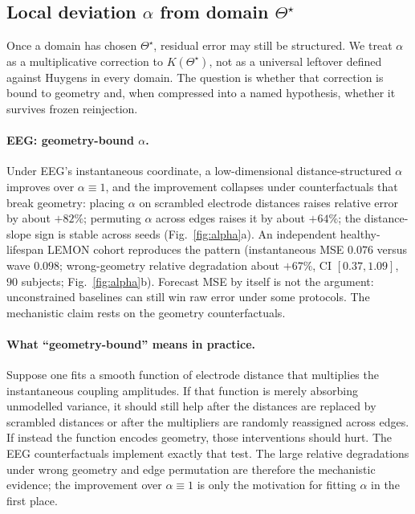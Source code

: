 \documentclass[twocolumn,10pt]{article}
\begin{document}
\subsection*{Local deviation \(\alpha\) from domain \(\Theta^{\star}\)}

Once a domain has chosen \(\Theta^{\star}\), residual error may still be
structured. We treat \(\alpha\) as a multiplicative correction to
\(K(\Theta^{\star})\), not as a universal leftover defined against Huygens in
every domain. The question is whether that correction is bound to geometry and,
when compressed into a named hypothesis, whether it survives frozen reinjection.

\paragraph{EEG: geometry-bound \(\alpha\).}
Under EEG's instantaneous coordinate, a low-dimensional distance-structured
\(\alpha\) improves over \(\alpha\equiv1\), and the improvement collapses under
counterfactuals that break geometry: placing \(\alpha\) on scrambled electrode
distances raises relative error by about \(+82\%\); permuting \(\alpha\) across
edges raises it by about \(+64\%\); the distance-slope sign is stable across
seeds (Fig.~\ref{fig:alpha}a). An independent healthy-lifespan LEMON cohort
reproduces the pattern (instantaneous MSE \(0.076\) versus wave \(0.098\);
wrong-geometry relative degradation about \(+67\%\), CI \([0.37,1.09]\),
\(90\) subjects; Fig.~\ref{fig:alpha}b). Forecast MSE by itself is not the
argument: unconstrained baselines can still win raw error under some protocols.
The mechanistic claim rests on the geometry counterfactuals.

\paragraph{What ``geometry-bound'' means in practice.}
Suppose one fits a smooth function of electrode distance that multiplies the
instantaneous coupling amplitudes. If that function is merely absorbing
unmodelled variance, it should still help after the distances are replaced by
scrambled distances or after the multipliers are randomly reassigned across
edges. If instead the function encodes geometry, those interventions should
hurt. The EEG counterfactuals implement exactly that test. The large relative
degradations under wrong geometry and edge permutation are therefore the
mechanistic evidence; the improvement over \(\alpha\equiv1\) is only the
motivation for fitting \(\alpha\) in the first place.
\end{document}
